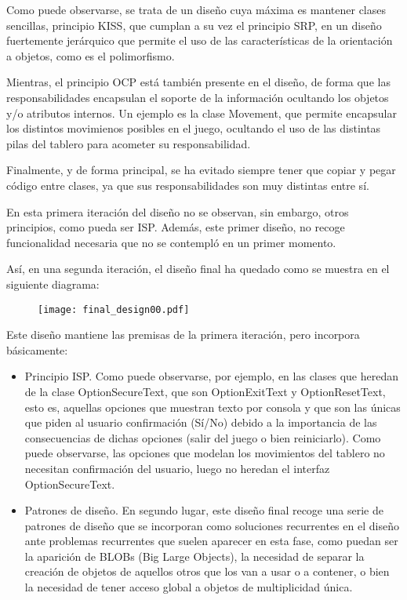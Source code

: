 \documentclass[11pt]{article}
\begin{document}
Como puede observarse, se trata de un diseño cuya máxima es mantener clases sencillas, principio KISS, que cumplan a su vez el principio SRP, en un diseño fuertemente jerárquico que permite el uso de las características de la orientación a objetos, como es el polimorfismo.

Mientras, el principio OCP está también presente en el diseño, de forma que las responsabilidades encapsulan el soporte de la información ocultando los objetos y/o atributos internos. Un ejemplo es la clase Movement, que permite encapsular los distintos movimienos posibles en el juego, ocultando el uso de las distintas pilas del tablero para acometer su responsabilidad.

Finalmente, y de forma principal, se ha evitado siempre tener que copiar y pegar código entre clases, ya que sus responsabilidades son muy distintas entre sí.

En esta primera iteración del diseño no se observan, sin embargo, otros principios, como pueda ser ISP. Además, este primer diseño, no recoge funcionalidad necesaria que no se contempló en un primer momento. 

Así, en una segunda iteración, el diseño final ha quedado como se muestra en el siguiente diagrama:

\begin{landscape}
\begin{center}
 \begin{figure}[H]
 \begin{center}
\texttt{[image: final\_design00.pdf]}
   \label{fig:design}
 \end{center}
 \end{figure}
\end{center}
\end{landscape}
\restoregeometry

Este diseño mantiene las premisas de la primera iteración, pero incorpora básicamente:
\begin{itemize}
\item{Principio ISP}. Como puede observarse, por ejemplo, en las clases que heredan de la clase OptionSecureText, que son OptionExitText y OptionResetText, esto es, aquellas opciones que muestran texto por consola y que son las únicas que piden al usuario confirmación (Sí/No) debido a la importancia de las consecuencias de dichas opciones (salir del juego o bien reiniciarlo). Como puede observarse, las opciones que modelan los movimientos del tablero no necesitan confirmación del usuario, luego no heredan el interfaz OptionSecureText.
\item{Patrones de diseño}. En segundo lugar, este diseño final recoge una serie de patrones de diseño que se incorporan como soluciones recurrentes en el diseño ante problemas recurrentes que suelen aparecer en esta fase, como puedan ser la aparición de BLOBs (Big Large Objects), la necesidad de separar la creación de objetos de aquellos otros que los van a usar o a contener, o bien la necesidad de tener acceso global a objetos de multiplicidad única.
\end{itemize}
\end{document}
